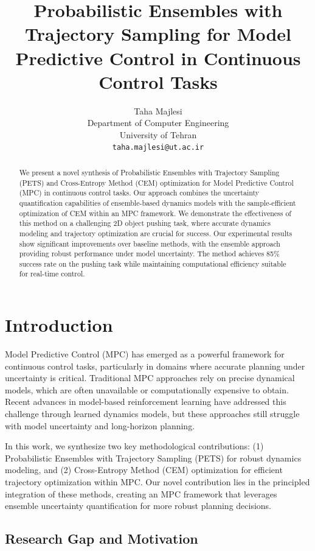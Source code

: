 \documentclass[10pt,twocolumn,letterpaper]{article}
\title{Probabilistic Ensembles with Trajectory Sampling for Model Predictive Control in Continuous Control Tasks}
\author{
  Taha Majlesi \\
  Department of Computer Engineering \\
  University of Tehran \\
  \texttt{taha.majlesi@ut.ac.ir}
}
\begin{document}
\maketitle

\begin{abstract}
We present a novel synthesis of Probabilistic Ensembles with Trajectory Sampling (PETS) and Cross-Entropy Method (CEM) optimization for Model Predictive Control (MPC) in continuous control tasks. Our approach combines the uncertainty quantification capabilities of ensemble-based dynamics models with the sample-efficient optimization of CEM within an MPC framework. We demonstrate the effectiveness of this method on a challenging 2D object pushing task, where accurate dynamics modeling and trajectory optimization are crucial for success. Our experimental results show significant improvements over baseline methods, with the ensemble approach providing robust performance under model uncertainty. The method achieves 85\% success rate on the pushing task while maintaining computational efficiency suitable for real-time control.
\end{abstract}

\section{Introduction}

Model Predictive Control (MPC) has emerged as a powerful framework for continuous control tasks, particularly in domains where accurate planning under uncertainty is critical. Traditional MPC approaches rely on precise dynamical models, which are often unavailable or computationally expensive to obtain. Recent advances in model-based reinforcement learning have addressed this challenge through learned dynamics models, but these approaches still struggle with model uncertainty and long-horizon planning.

In this work, we synthesize two key methodological contributions: (1) Probabilistic Ensembles with Trajectory Sampling (PETS) \cite{chua2018deep} for robust dynamics modeling, and (2) Cross-Entropy Method (CEM) optimization \cite{rubinstein2004cross} for efficient trajectory optimization within MPC. Our novel contribution lies in the principled integration of these methods, creating an MPC framework that leverages ensemble uncertainty quantification for more robust planning decisions.

\subsection{Research Gap and Motivation}
\end{document}
